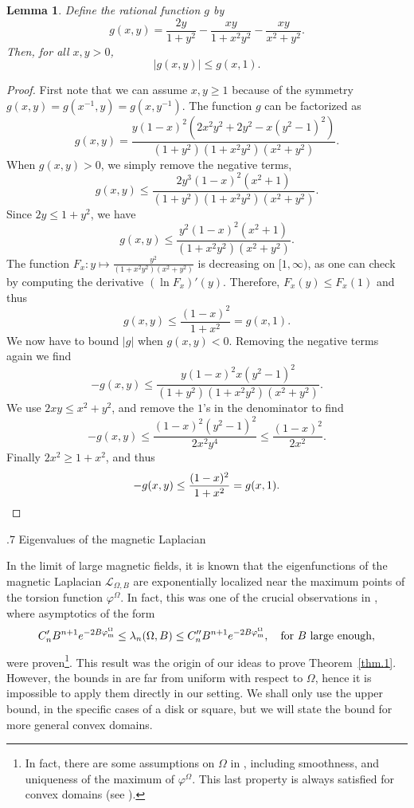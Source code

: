 \documentclass[11pt,a4paper]{amsart}
\makeatletter
\def\section{\@startsection{section}{1}\z@{.9\linespacing\@plus\linespacing}%
	{.7\linespacing} {\fontsize{13}{14}\selectfont\bfseries\centering}}
\numberwithin{figure}{section}
\numberwithin{equation}{section}
\theoremstyle{plain}%
\theoremstyle{remark}
\theoremstyle{plain}
\newtheorem{lemma}[theorem]{Lemma}
\makeatother
\begin{document}
\begin{lemma}\label{lem.g}
	Define the rational function $g$ by
	\[g(x,y) = \frac{2y}{1+y^2} - \frac{xy}{1+x^2y^2} - \frac{xy}{x^2+y^2}. \]
	Then, for all $x,y>0$,
	\[|g(x,y)| \leq g(x,1).\]
\end{lemma}

\begin{proof}
	First note that we can assume $x,y \geq 1$ because of the symmetry $g(x,y) = g(x^{-1},y) = g(x,y^{-1})$. The function $g$ can be factorized as
	\begin{equation}\label{eqg}
		g(x,y) = \frac{y(1-x)^2(2x^2y^2 + 2y^2 - x(y^2-1)^2)}{(1+y^2)(1+x^2y^2)(x^2+y^2)}. 
	\end{equation}
	When $g(x,y) >0$, we simply remove the negative terms,
	\[g(x,y) \leq \frac{2y^3(1-x)^2(x^2+1)}{(1+y^2)(1+x^2y^2)(x^2+y^2)}. \]
	Since $2y \leq 1+y^2$, we have
	\[g(x,y) \leq \frac{y^2(1-x)^2(x^2+1)}{(1+x^2y^2)(x^2+y^2)}.\]
	The function $F_x : y \mapsto \frac{y^2}{(1+x^2y^2)(x^2+y^2)}$ is decreasing on $[1,\infty)$, as one can check by computing the derivative $(\ln F_x)'(y)$. Therefore, $F_x(y) \leq F_x(1)$ and thus
	\[ g(x,y) \leq \frac{(1-x)^2}{1+x^2} = g(x,1).\]
We now have to bound $|g|$ when $g(x,y) <0$. Removing the negative terms again we find
\[ -g(x,y) \leq \frac{y(1-x)^2x(y^2-1)^2}{(1+y^2)(1+x^2y^2)(x^2+y^2)}.\]
We use $2xy \leq x^2 + y^2$, and remove the $1$'s in the denominator to find
\[ -g(x,y) \leq \frac{(1-x)^2(y^2-1)^2}{2x^2 y^4} \leq \frac{(1-x)^2}{2x^2}. \]
Finally $2x^2 \geq 1+x^2$, and thus
\[ -g(x,y) \leq \frac{(1-x)^2}{1+x^2} = g(x,1).
\qedhere
\]
\end{proof}

\section{Eigenvalues of the magnetic Laplacian}\label{sec.magnetic.laplacian}

In the limit of large magnetic fields, it is known that the eigenfunctions of the magnetic Laplacian $\mathscr{L}_{\Omega,B}$ are exponentially localized near the maximum points of the torsion function $\varphi^\Omega$. In fact, this was one of the crucial observations in \cite{MagneticPauli}, where asymptotics of the form
\[ C_n' B^{n+1} e^{-2B \varphi_{\rm m}^\Omega} \leq \lambda_n(\Omega,B) \leq C_n'' B^{n+1} e^{-2B \varphi_{\rm m}^\Omega}, \quad \text{for $B$ large enough,}\] were proven\footnote{In fact, there are some assumptions on $\Omega$ in \cite{MagneticPauli}, including smoothness, and uniqueness of the maximum of $\varphi^\Omega$. This last property is always satisfied for convex domains (see \cite[Theorem 1]{KL87}).}. This result was the origin of our ideas to prove Theorem~\ref{thm.1}. However, the bounds in \cite{MagneticPauli} are far from uniform with respect to $\Omega$, hence it is impossible to apply them directly in our setting. We shall only use the upper bound, in the specific cases of a disk or square, but we will state the bound for more general convex domains. 
\end{document}
